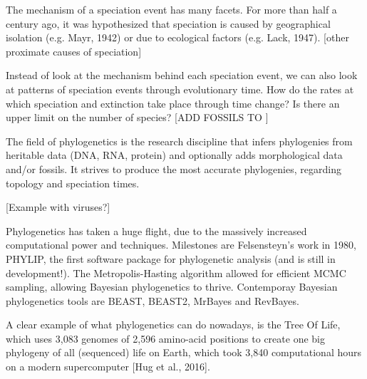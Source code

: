 The mechanism of a speciation event has many facets.
For more than half a century ago, it was hypothesized
that speciation is caused by geographical isolation (e.g. Mayr, 1942)
or due to ecological factors (e.g. Lack, 1947). [other proximate 
causes of speciation]

%

Instead of look at the mechanism behind each speciation event,
we can also look at patterns of speciation events through evolutionary time.
How do the rates at which speciation and extinction take place through time
change? Is there an upper limit on the number of species?
[ADD FOSSILS TO ]


The field of phylogenetics is the research discipline that
infers phylogenies from heritable data (DNA, RNA, protein) and
optionally adds morphological data and/or fossils. It strives
to produce the most accurate phylogenies, regarding topology
and speciation times.

[Example with viruses?]

%
%
%

Phylogenetics has taken a huge flight, due to the massively increased
computational power and techniques. Milestones are Felsensteyn's work
in 1980, PHYLIP, the first software package for phylogenetic 
analysis (and is still in development!).
The Metropolis-Hasting algorithm allowed for efficient MCMC
sampling, allowing Bayesian phylogenetics to thrive. Contemporay
Bayesian phylogenetics tools are BEAST, BEAST2, MrBayes and RevBayes.

%
%

A clear example of what phylogenetics can do nowadays,
is the Tree Of Life, which uses 
3,083 genomes of 2,596 amino-acid positions 
to create one big phylogeny of all (sequenced) life on Earth,
which took 3,840 computational hours on a modern supercomputer [Hug et al., 2016].

%
%
%

